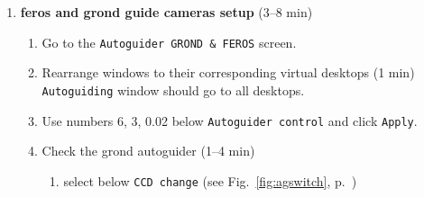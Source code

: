 \documentclass[11pt,fleqn]{book}
\def\figref#1{Fig.~\ref{fig:#1}, p.~\pageref{fig:#1}}
\begin{document}
\begin{enumerate}
\begin{enumerate}
         \item If a restart (point \ref{list:grinsstart}) was done, set the image displays (1 min).
            \begin{enumerate}
               \item Go to the \texttt{GROND optical (FIERA)} screen.
               \item Find the \gls{rtd} window (griz images).
               \item Check that image is flipped along both axes and rotated (see \figref{flip}).
               \item Go to the \texttt{GROND infrared (IRACE)} screen.
               \item Find the irtd window (JHK images).               
               \item Check that images are received live.\\
                     The left column should have a green button with text \texttt{Stop} (see \figref{iflip}).\\
                     If it is gray with text \texttt{Start}, click it so that it gets as describe above.
              \item Check that the image is horizontally flipped (see \figref{iflip}).
              \item Check that the image has positive pixel values\\
                    Find menu option \texttt{Negative real time image}
             \end{enumerate}
        \end{enumerate}
  \item \textbf{\gls{feros} and \gls{grond} guide cameras setup} (3--8 min)\label{list:ag}
        \begin{enumerate}
           \item Go to the \texttt{Autoguider GROND \& FEROS} screen. 
           \item Rearrange windows to their corresponding virtual desktops (1 min)\\
                 \texttt{Autoguiding} window should go to all desktops.
           \item Use numbers 6, 3, 0.02 below \texttt{Autoguider control} and click \texttt{Apply}.
           \item Check the \gls{grond} autoguider (1--4 min)
               \begin{enumerate}
                  \item select  below \texttt{CCD change} (see \figref{agswitch})

\end{enumerate}
\end{enumerate}
\end{enumerate}
\end{document}
